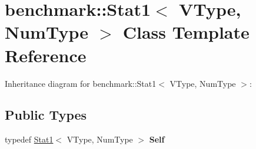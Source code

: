 \hypertarget{classbenchmark_1_1_stat1}{}\section{benchmark\+:\+:Stat1$<$ V\+Type, Num\+Type $>$ Class Template Reference}
\label{classbenchmark_1_1_stat1}


Inheritance diagram for benchmark\+:\+:Stat1$<$ V\+Type, Num\+Type $>$\+:
\subsection*{Public Types}
\begin{DoxyCompactItemize}
\item 
\mbox{\label{classbenchmark_1_1_stat1_a19ebdf53dc11613b62a7ac35918c011f}} 
typedef \mbox{\hyperlink{classbenchmark_1_1_stat1}{Stat1}}$<$ V\+Type, Num\+Type $>$ {\bfseries Self}
\end{DoxyCompactItemize}
